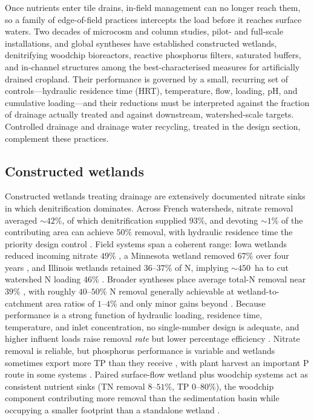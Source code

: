 Once nutrients enter tile drains, in-field management can no longer reach
them, so a family of edge-of-field practices intercepts the load before it
reaches surface waters. Two decades of microcosm and column studies,
pilot- and full-scale installations, and global syntheses have established
constructed wetlands, denitrifying woodchip bioreactors, reactive
phosphorus filters, saturated buffers, and in-channel structures among the
best-characterised measures for artificially drained cropland. Their
performance is governed by a small, recurring set of controls---hydraulic
residence time (HRT), temperature, flow, loading, pH, and cumulative
loading---and their reductions must be interpreted against the fraction of
drainage actually treated and against downstream, watershed-scale targets.
Controlled drainage and drainage water recycling, treated in the design
section, complement these practices.

\subsection{Constructed wetlands}

Constructed wetlands treating drainage are extensively documented nitrate
sinks in which denitrification dominates. Across French watersheds, nitrate
removal averaged $\sim42\%$, of which denitrification supplied $93\%$, and
devoting $\sim1\%$ of the contributing area can achieve $50\%$ removal, with
hydraulic residence time the priority design control \parencite{Tournebize2017}.
Field systems span a coherent range: Iowa wetlands reduced incoming nitrate
$49\%$ \parencite{Drake2018}, a Minnesota wetland removed $67\%$ over four
years \parencite{Gordon2021}, and Illinois wetlands retained $36$--$37\%$ of
N, implying $\sim450$~ha to cut watershed N loading $46\%$
\parencite{Kovacic2006}. Broader syntheses place average total-N removal near
$39\%$ \parencite{Wang2025b}, with roughly $40$--$50\%$ N removal generally
achievable at wetland-to-catchment area ratios of $1$--$4\%$ and only minor
gains beyond \parencite{Mendes2021}. Because performance is a strong function
of hydraulic loading, residence time, temperature, and inlet concentration,
no single-number design is adequate, and higher influent loads raise removal
\emph{rate} but lower percentage efficiency
\parencite{Kadlec2012,Steidl2019,Mendes2021}. Nitrate removal is reliable, but
phosphorus performance is variable and wetlands sometimes export more TP than
they receive \parencite{Tanner2005,Tanner2011,Messer2021}, with plant harvest
an important P route in some systems \parencite{Lenhart2016}. Paired
surface-flow wetland plus woodchip systems act as consistent nutrient sinks
(TN removal $8$--$51\%$, TP $0$--$80\%$), the woodchip component contributing
more removal than the sedimentation basin while occupying a smaller footprint
than a standalone wetland \parencite{Pugliese2020}.

